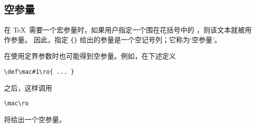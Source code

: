 \documentclass{book}
\begin{document}
\subsection{空参量}

在 \TeX\ 需要一个宏参量时，如果用户指定一个围在花括号中的
，则该文本就被用作参量。
因此，指定 \verb-{}- 给出的参量是一个空记号列；它称为`空参量'。

在使用定界参数时也可能得到空参量。例如，在下述定义
\begin{verbatim}
\def\mac#1\ro{ ... }
\end{verbatim}
之后，这样调用
\begin{verbatim}
\mac\ro
\end{verbatim}
将给出一个空参量。

\begin{comment}
However, only
one empty argument can be created this way: 
if the macro had been defined as
\begin{verbatim}
\def\mac#1#2\ro{ ... }
\end{verbatim}
the same call
\begin{verbatim}
\mac\ro \othermacro \stillothermacro
\end{verbatim}
will probably cause a `\n{Runaway argument?}' error message.
Explanation: the first parameter is undelimited, so the corresponding
argument is `\cs{ro}'; after that \TeX\ starts looking for a list
of tokens delimited by~\cs{ro}.
\end{comment}
\end{document}
